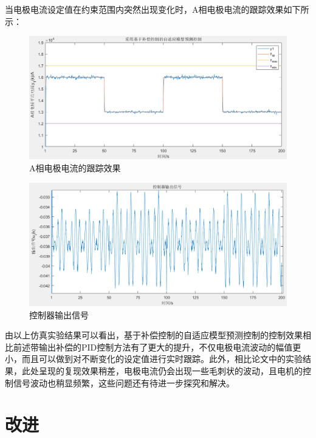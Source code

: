 \documentclass[UTF8, 12pt]{article}
\begin{document}
当电极电流设定值在约束范围内突然出现变化时，A相电极电流的跟踪效果如下所示：
\begin{figure}[H]
    \centering %
    \includegraphics[width=.8\textwidth]{figure/模型预测-输出信号.png} 
    \caption{A相电极电流的跟踪效果} %
\end{figure}
\begin{figure}[H]
    \centering %
    \includegraphics[width=.8\textwidth]{figure/模型预测-控制器输出信号.png} 
    \caption{控制器输出信号} %
\end{figure}

由以上仿真实验结果可以看出，基于补偿控制的自适应模型预测控制的控制效果相比前述带输出补偿的PID控制方法有了更大的提升，不仅电极电流波动的幅值更小，而且可以做到对不断变化的设定值进行实时跟踪。此外，相比论文中的实验结果，此处呈现的复现效果稍差，电极电流仍会出现一些毛刺状的波动，且电机的控制信号波动也稍显频繁，这些问题还有待进一步探究和解决。

%
\section{改进}

\end{document}
